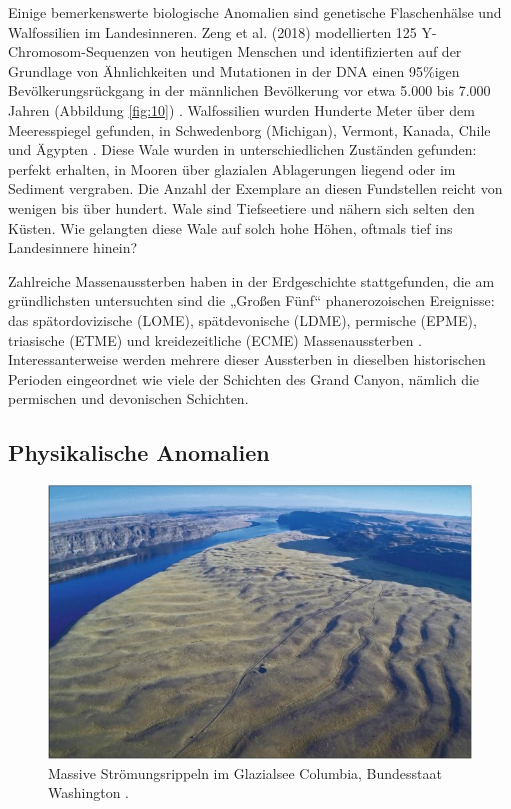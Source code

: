 \documentclass[10pt,twocolumn,letterpaper]{article}
\begin{document}
Einige bemerkenswerte biologische Anomalien sind genetische Flaschenhälse und Walfossilien im Landesinneren. Zeng et al. (2018) modellierten 125 Y-Chromosom-Sequenzen von heutigen Menschen und identifizierten auf der Grundlage von Ähnlichkeiten und Mutationen in der DNA einen 95\%igen Bevölkerungsrückgang in der männlichen Bevölkerung vor etwa 5.000 bis 7.000 Jahren (Abbildung \ref{fig:10}) \cite{62}. Walfossilien wurden Hunderte Meter über dem Meeresspiegel gefunden, in Schwedenborg (Michigan), Vermont, Kanada, Chile und Ägypten \cite{63,64,65,66}. Diese Wale wurden in unterschiedlichen Zuständen gefunden: perfekt erhalten, in Mooren über glazialen Ablagerungen liegend oder im Sediment vergraben. Die Anzahl der Exemplare an diesen Fundstellen reicht von wenigen bis über hundert. Wale sind Tiefseetiere und nähern sich selten den Küsten. Wie gelangten diese Wale auf solch hohe Höhen, oftmals tief ins Landesinnere hinein?

Zahlreiche Massenaussterben haben in der Erdgeschichte stattgefunden, die am gründlichsten untersuchten sind die „Großen Fünf“ phanerozoischen Ereignisse: das spätordovizische (LOME), spätdevonische (LDME), permische (EPME), triasische (ETME) und kreidezeitliche (ECME) Massenaussterben \cite{88,89}. Interessanterweise werden mehrere dieser Aussterben in dieselben historischen Perioden eingeordnet wie viele der Schichten des Grand Canyon, nämlich die permischen und devonischen Schichten.

\subsection{Physikalische Anomalien}

\begin{figure}[b]
\begin{center}
   \includegraphics[width=1\linewidth]{columbia.jpg}
\end{center}
   \caption{Massive Strömungsrippeln im Glazialsee Columbia, Bundesstaat Washington \cite{80}.}
\label{fig:11}
\label{fig:onecol}
\end{figure}
\end{document}
